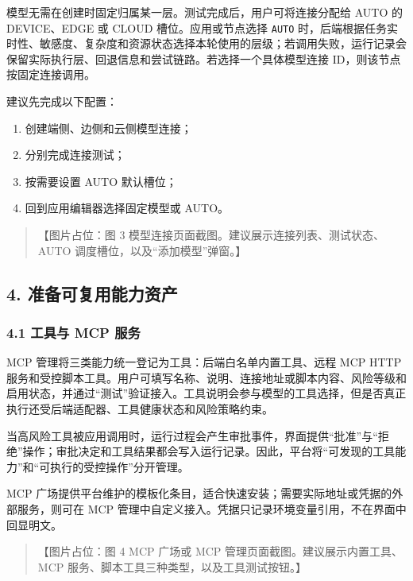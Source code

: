 \documentclass[UTF8,a4paper,12pt]{ctexart}
\providecommand{\tightlist}{%
  \setlength{\itemsep}{0pt}\setlength{\parskip}{0pt}}
\begin{document}
模型无需在创建时固定归属某一层。测试完成后，用户可将连接分配给 AUTO 的 DEVICE、EDGE 或 CLOUD 槽位。应用或节点选择 \texttt{AUTO} 时，后端根据任务实时性、敏感度、复杂度和资源状态选择本轮使用的层级；若调用失败，运行记录会保留实际执行层、回退信息和尝试链路。若选择一个具体模型连接 ID，则该节点按固定连接调用。

建议先完成以下配置：

\begin{enumerate}
\def\labelenumi{\arabic{enumi}.}
\tightlist
\item
  创建端侧、边侧和云侧模型连接；
\item
  分别完成连接测试；
\item
  按需要设置 AUTO 默认槽位；
\item
  回到应用编辑器选择固定模型或 AUTO。
\end{enumerate}

\begin{quote}
【图片占位：图 3 模型连接页面截图。建议展示连接列表、测试状态、AUTO 调度槽位，以及``添加模型''弹窗。】
\end{quote}

\subsection{4. 准备可复用能力资产}

\subsubsection{4.1 工具与 MCP 服务}

MCP 管理将三类能力统一登记为工具：后端白名单内置工具、远程 MCP HTTP 服务和受控脚本工具。用户可填写名称、说明、连接地址或脚本内容、风险等级和启用状态，并通过``测试''验证接入。工具说明会参与模型的工具选择，但是否真正执行还受后端适配器、工具健康状态和风险策略约束。

当高风险工具被应用调用时，运行过程会产生审批事件，界面提供``批准''与``拒绝''操作；审批决定和工具结果都会写入运行记录。因此，平台将``可发现的工具能力''和``可执行的受控操作''分开管理。

MCP 广场提供平台维护的模板化条目，适合快速安装；需要实际地址或凭据的外部服务，则可在 MCP 管理中自定义接入。凭据只记录环境变量引用，不在界面中回显明文。

\begin{quote}
【图片占位：图 4 MCP 广场或 MCP 管理页面截图。建议展示内置工具、MCP 服务、脚本工具三种类型，以及工具测试按钮。】
\end{quote}
\end{document}
